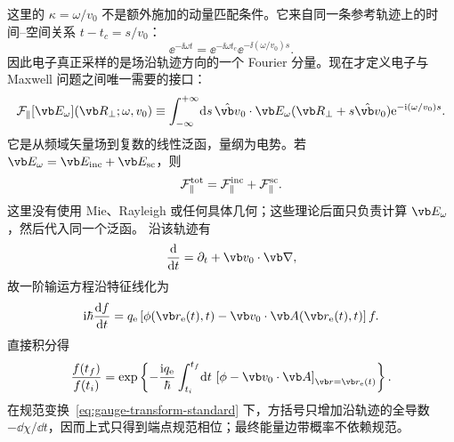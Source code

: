 这里的 $\kappa=\omega/v_0$ 不是额外施加的动量匹配条件。它来自同一条参考轨迹上的时间--空间关系 $t-t_c=s/v_0$：
\begin{equation}
\ee^{-\ii\omega t}
=\ee^{-\ii\omega t_c}\ee^{-\ii(\omega/v_0)s}.
\label{eq:time-to-space-phase}
\end{equation}
因此电子真正采样的是场沿轨迹方向的一个 Fourier 分量。现在才定义电子与 Maxwell 问题之间唯一需要的接口：
\begin{equation}
{
\mathcal F_{\parallel}[\vb E_\omega](\vb R_\perp;\omega,v_0)
\equiv
\int_{-\infty}^{+\infty}\!\dd s\,
\hat{\vb v}_0\cdot\vb E_\omega(\vb R_\perp+s\hat{\vb v}_0)
\ee^{-\ii(\omega/v_0)s}.}
\label{eq:Fparallel-general-def}
\end{equation}
它是从频域矢量场到复数的线性泛函，量纲为电势。若
$\vb E_\omega=\vb E_{\rm inc}+\vb E_{\rm sc}$，则
\begin{equation}
\mathcal F_{\parallel}^{\rm tot}
=\mathcal F_{\parallel}^{\rm inc}
+\mathcal F_{\parallel}^{\rm sc}.
\label{eq:F-total-decomposition}
\end{equation}
这里没有使用 Mie、Rayleigh 或任何具体几何；这些理论后面只负责计算 $\vb E_\omega$，然后代入同一个泛函。
沿该轨迹有
\begin{equation}
\frac{\dd}{\dd t}
=\partial_t+\vb v_0\cdot\vb\nabla,
\end{equation}
故一阶输运方程沿特征线化为
\begin{equation}
\ii\hbar\frac{\dd f}{\dd t}
=q_{\rm e}\left[\phi(\vb r_{\rm e}(t),t)-\vb v_0\cdot\vb A(\vb r_{\rm e}(t),t)\right]f.
\end{equation}
直接积分得
\begin{equation}
{
\frac{f(t_f)}{f(t_i)}
=\exp\left\{-\frac{\ii q_{\rm e}}{\hbar}
\int_{t_i}^{t_f}\!\dd t\,
\left[\phi-\vb v_0\cdot\vb A\right]_{\vb r=\vb r_{\rm e}(t)}\right\}.}
\label{eq:eikonal-phase-general}
\end{equation}
在规范变换~\cref{eq:gauge-transform-standard} 下，方括号只增加沿轨迹的全导数 $-\dd\chi/\dd t$，因而上式只得到端点规范相位；最终能量边带概率不依赖规范。

